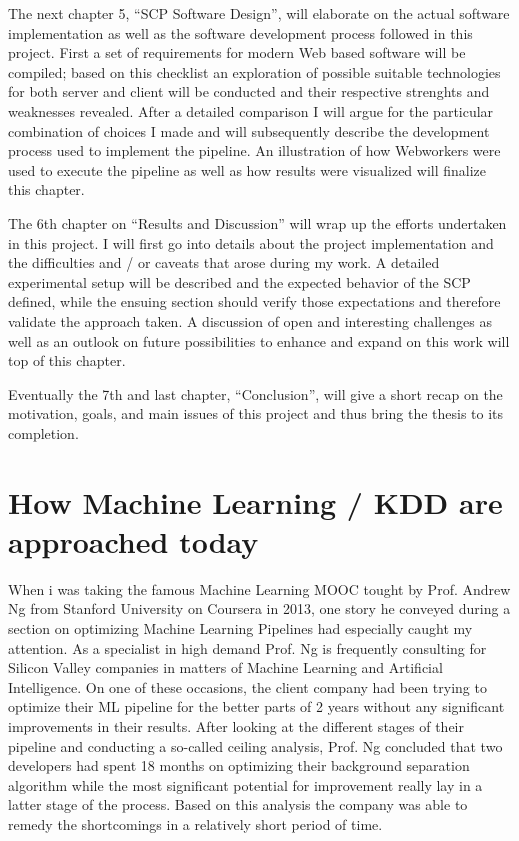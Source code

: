 \par

The next chapter 5, ``SCP Software Design'', will elaborate on the actual software implementation as well as the software development process followed in this project. First a set of requirements for modern Web based software will be compiled; based on this checklist an exploration of possible suitable technologies for both server and client will be conducted and their respective strenghts and weaknesses revealed. After a detailed comparison I will argue for the particular combination of choices I made and will subsequently describe the development process used to implement the pipeline. An illustration of how Webworkers were used to execute the pipeline as well as how results were visualized will finalize this chapter.

\par

The 6th chapter on ``Results and Discussion'' will wrap up the efforts undertaken in this project. I will first go into details about the project implementation and the difficulties and / or caveats that arose during my work. A detailed experimental setup will be described and the expected behavior of the SCP defined, while the ensuing section should verify those expectations and therefore validate the approach taken. A discussion of open and interesting challenges as well as  an outlook on future possibilities to enhance and expand on this work will top of this chapter.

\par 

Eventually the 7th and last chapter, ``Conclusion'', will give a short recap on the motivation, goals, and main issues of this project and thus bring the thesis to its completion.



\section{How Machine Learning / KDD are approached today}
\label{sect:ml_kdd_today}

When i was taking the famous Machine Learning MOOC tought by Prof. Andrew Ng from Stanford University on Coursera in 2013, one story he conveyed during a section on optimizing Machine Learning Pipelines had especially caught my attention. As a specialist in high demand Prof. Ng is frequently consulting for Silicon Valley companies in matters of Machine Learning and Artificial Intelligence. On one of these occasions, the client company had been trying to optimize their ML pipeline for the better parts of 2 years without any significant improvements in their results. After looking at the different stages of their pipeline and conducting a so-called ceiling analysis, Prof. Ng concluded that two developers had spent 18 months on optimizing their background separation algorithm while the most significant potential for improvement really lay in a latter stage of the process. Based on this analysis the company was able to remedy the shortcomings in a relatively short period of time.

